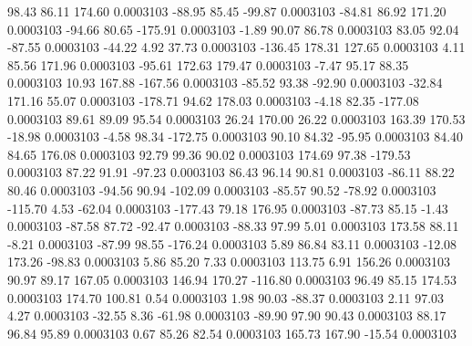        98.43       86.11      174.60     0.0003103
      -88.95       85.45      -99.87     0.0003103
      -84.81       86.92      171.20     0.0003103
      -94.66       80.65     -175.91     0.0003103
       -1.89       90.07       86.78     0.0003103
       83.05       92.04      -87.55     0.0003103
      -44.22        4.92       37.73     0.0003103
     -136.45      178.31      127.65     0.0003103
        4.11       85.56      171.96     0.0003103
      -95.61      172.63      179.47     0.0003103
       -7.47       95.17       88.35     0.0003103
       10.93      167.88     -167.56     0.0003103
      -85.52       93.38      -92.90     0.0003103
      -32.84      171.16       55.07     0.0003103
     -178.71       94.62      178.03     0.0003103
       -4.18       82.35     -177.08     0.0003103
       89.61       89.09       95.54     0.0003103
       26.24      170.00       26.22     0.0003103
      163.39      170.53      -18.98     0.0003103
       -4.58       98.34     -172.75     0.0003103
       90.10       84.32      -95.95     0.0003103
       84.40       84.65      176.08     0.0003103
       92.79       99.36       90.02     0.0003103
      174.69       97.38     -179.53     0.0003103
       87.22       91.91      -97.23     0.0003103
       86.43       96.14       90.81     0.0003103
      -86.11       88.22       80.46     0.0003103
      -94.56       90.94     -102.09     0.0003103
      -85.57       90.52      -78.92     0.0003103
     -115.70        4.53      -62.04     0.0003103
     -177.43       79.18      176.95     0.0003103
      -87.73       85.15       -1.43     0.0003103
      -87.58       87.72      -92.47     0.0003103
      -88.33       97.99        5.01     0.0003103
      173.58       88.11       -8.21     0.0003103
      -87.99       98.55     -176.24     0.0003103
        5.89       86.84       83.11     0.0003103
      -12.08      173.26      -98.83     0.0003103
        5.86       85.20        7.33     0.0003103
      113.75        6.91      156.26     0.0003103
       90.97       89.17      167.05     0.0003103
      146.94      170.27     -116.80     0.0003103
       96.49       85.15      174.53     0.0003103
      174.70      100.81        0.54     0.0003103
        1.98       90.03      -88.37     0.0003103
        2.11       97.03        4.27     0.0003103
      -32.55        8.36      -61.98     0.0003103
      -89.90       97.90       90.43     0.0003103
       88.17       96.84       95.89     0.0003103
        0.67       85.26       82.54     0.0003103
      165.73      167.90      -15.54     0.0003103
